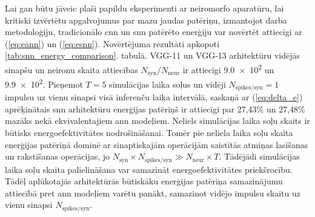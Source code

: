Lai gan būtu jāveic plaši papildu eksperimenti ar
neiromorfo aparatūru, lai kritiski izvērtētu apgalvojumus par mazu jaudas patēriņu,
izmantojot darba \cite{dampfhoffer2022} metodoloģiju,
tradicionālo \Gls{cnn} un \Gls{snn} patērēto enerģiju var novērtēt attiecīgi ar (\ref{eq:eann}) un (\ref{eq:esnn}).
Novērtējuma rezultāti apkopoti \ref{tab:snn_energy_comparison}. tabulā. VGG-11 un VGG-13 arhitektūru vidējās sinapšu un neironu
skaita attiecības \(N_{\mathrm{syn}}/N_{\mathrm{neur}}\) ir attiecīgi \num{9.0e2} un \num{9.9e2}. Pieņemot \(T=5\)
simulācijas laika soļus un vidēji \(N_{\mathrm{spikes/syn}}=1\) impulsu uz vienu sinapsi visā inferenču laika intervālā,
saskaņā ar (\ref{eq:delta_e}) aprēķinātais \Gls{snn} arhitektūru enerģijas patēriņš ir attiecīgi par 27,43\% un 27,48\%
mazāks nekā ekvivalentajiem \Gls{ann} modeļiem.
Neliels simulācijas laika soļu skaits ir būtisks energoefektivitātes
nodrošināšanai. Tomēr pie neliela laika soļu skaita enerģijas patēriņā dominē ar sinaptiskajām operācijām saistītās atmiņas
lasīšanas un rakstīšanas operācijas, jo \(N_{\mathrm{syn}} \times N_{\mathrm{spikes/syn}} \gg N_{\mathrm{neur}} \times T\).
Tādējādi simulācijas laika soļu skaita palielināšana var samazināt energoefektivitātes priekšrocību.
Tādēļ aplūkotajās arhitektūrās būtiskāku enerģijas patēriņa samazinājumu attiecībā pret \Gls{ann} modeļiem
varētu panākt, samazinot vidējo impulsu skaitu uz vienu sinapsi \(N_{\mathrm{spikes/syn}}\).

